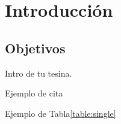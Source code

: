 \chapter{Introducción}\label{cap:intro}

\section{Objetivos}\label{cap:intro:sec:obj}

Intro de tu tesina.

Ejemplo de cita\cite{esp:blast2}



Ejemplo de Tabla\ref{table:single}

